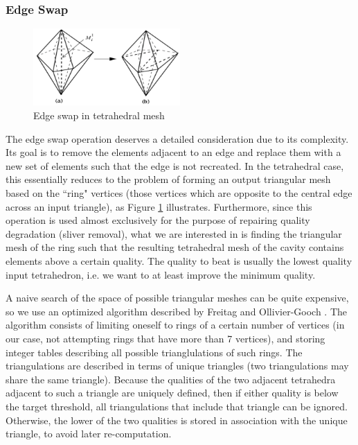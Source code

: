 \subsubsection{Edge Swap}
\label{sec:swap}

\begin{figure}
\begin{center}
\includegraphics[width=0.5\textwidth]{swap.png}
\caption{Edge swap in tetrahedral mesh
\cite{lu2011developments}}
\label{fig:swap}
\end{center}
\end{figure}

The edge swap operation deserves a detailed consideration due
to its complexity.
Its goal is to remove the elements adjacent to an edge and
replace them with a new set of elements such that the edge
is not recreated.
In the tetrahedral case, this essentially reduces to the problem
of forming an output triangular mesh based on the ``ring" vertices
(those vertices which are opposite to the central edge across
an input triangle), as Figure \ref{fig:swap} illustrates.
Furthermore, since this operation is used almost exclusively
for the purpose of repairing quality degradation (sliver removal),
what we are interested in is finding the triangular mesh of the
ring such that the resulting tetrahedral mesh of the cavity
contains elements above a certain quality.
The quality to beat is usually the lowest quality input
tetrahedron, i.e. we want to at least improve the minimum quality.

A naive search of the space of possible triangular meshes
can be quite expensive, so we use an optimized algorithm
described by Freitag and Ollivier-Gooch \cite{freitag1997tetrahedral}.
The algorithm consists of limiting oneself to rings of a
certain number of vertices (in our case, not attempting
rings that have more than 7 vertices), and storing integer
tables describing all possible trianglulations of such rings.
The triangulations are described in terms of unique triangles
(two triangulations may share the same triangle).
Because the qualities of the two adjacent tetrahedra adjacent
to such a triangle are uniquely defined, then if either quality
is below the target threshold, all triangulations that include
that triangle can be ignored.
Otherwise, the lower of the two qualities is stored in association
with the unique triangle, to avoid later re-computation.

